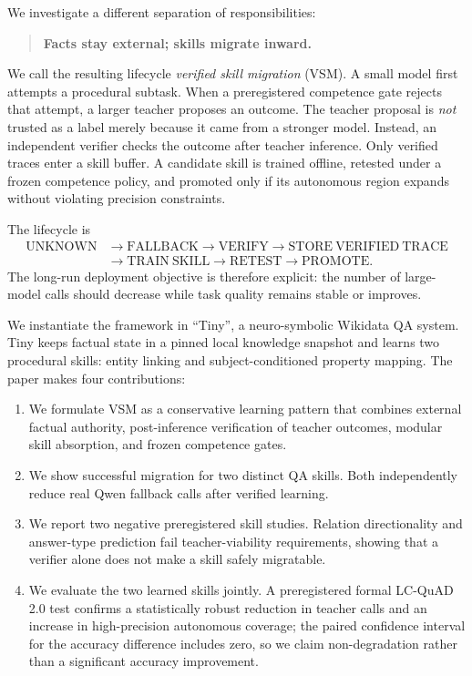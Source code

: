 \documentclass[10pt]{article}
\begin{document}
We investigate a different separation of responsibilities:
\begin{quote}
\centering
\textbf{Facts stay external; skills migrate inward.}
\end{quote}

We call the resulting lifecycle \emph{verified skill migration} (VSM). A small model first attempts a procedural subtask. When a preregistered competence gate rejects that attempt, a larger teacher proposes an outcome. The teacher proposal is \emph{not} trusted as a label merely because it came from a stronger model. Instead, an independent verifier checks the outcome after teacher inference. Only verified traces enter a skill buffer. A candidate skill is trained offline, retested under a frozen competence policy, and promoted only if its autonomous region expands without violating precision constraints.

The lifecycle is
\[
\begin{aligned}
\mathrm{UNKNOWN}&\rightarrow\mathrm{FALLBACK}\rightarrow\mathrm{VERIFY}
\rightarrow\mathrm{STORE\ VERIFIED\ TRACE}\\
&\rightarrow\mathrm{TRAIN\ SKILL}\rightarrow\mathrm{RETEST}
\rightarrow\mathrm{PROMOTE}.
\end{aligned}
\]
The long-run deployment objective is therefore explicit: the number of large-model calls should decrease while task quality remains stable or improves.

We instantiate the framework in ``Tiny'', a neuro-symbolic Wikidata QA system. Tiny keeps factual state in a pinned local knowledge snapshot and learns two procedural skills: entity linking and subject-conditioned property mapping. The paper makes four contributions:

\begin{enumerate}[leftmargin=*]
    \item We formulate VSM as a conservative learning pattern that combines external factual authority, post-inference verification of teacher outcomes, modular skill absorption, and frozen competence gates.
    \item We show successful migration for two distinct QA skills. Both independently reduce real Qwen fallback calls after verified learning.
    \item We report two negative preregistered skill studies. Relation directionality and answer-type prediction fail teacher-viability requirements, showing that a verifier alone does not make a skill safely migratable.
    \item We evaluate the two learned skills jointly. A preregistered formal LC-QuAD 2.0 test confirms a statistically robust reduction in teacher calls and an increase in high-precision autonomous coverage; the paired confidence interval for the accuracy difference includes zero, so we claim non-degradation rather than a significant accuracy improvement.
\end{enumerate}
\end{document}
